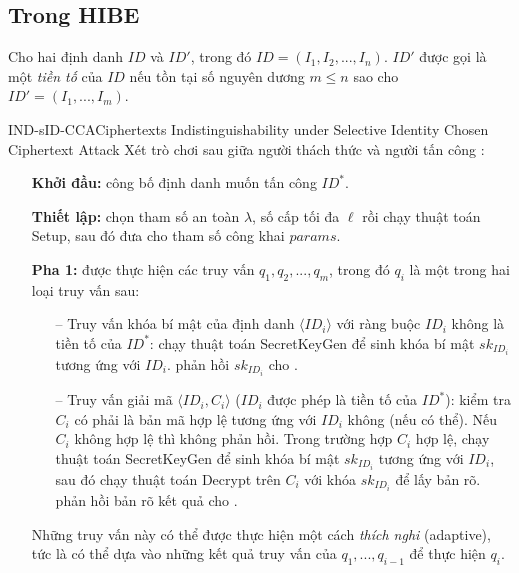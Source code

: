\documentclass[class=report, crop=false]{standalone}
\begin{document}
		\subsection{Trong HIBE}
			\begin{definition}
				Cho hai định danh $ID$ và $ID'$, trong đó $ID = (I_1, I_2, ..., I_n)$. $ID'$ được gọi là một \textit{tiền tố} của $ID$ nếu tồn tại số nguyên dương $m \leq n$ sao cho $ID' = (I_1, ..., I_m)$.
			\end{definition}
			\newpage
			\begin{game}{IND-sID-CCA}{Ciphertexts Indistinguishability under Selective Identity Chosen Ciphertext Attack}
				Xét trò chơi sau giữa người thách thức \challenger và người tấn công \adversary:
				\vspace{-1.8\baselineskip}
				\begin{itemize}[leftmargin=1.5cm, itemindent=-0.5cm]
					\item[] \textbf{Khởi đầu:} \adversary công bố định danh muốn tấn công $ID^*$.
					\item[] \textbf{Thiết lập:} \challenger chọn tham số an toàn $\lambda$, số cấp tối đa $\ell$ rồi chạy thuật toán \textsf{Setup}, sau đó đưa cho \adversary tham số công khai $params$.
					\item[] \textbf{Pha 1:} \adversary được thực hiện các truy vấn $q_1, q_2, ..., q_m$, trong đó $q_i$ là một trong hai loại truy vấn sau:
					\begin{itemize}
						\item[--] Truy vấn khóa bí mật của định danh $\langle ID_i \rangle$ với ràng buộc $ID_i$ không là tiền tố của $ID^*$: \challenger chạy thuật toán \textsf{SecretKeyGen} để sinh khóa bí mật $sk_{ID_i}$ tương ứng với $ID_i$. \challenger phản hồi $sk_{ID_i}$ cho \adversary .
						\item[--] Truy vấn giải mã $\langle ID_i, C_i \rangle$ ($ID_i$ được phép là tiền tố của $ID^*$): \challenger kiểm tra $C_i$ có phải là bản mã hợp lệ tương ứng với $ID_i$ không (nếu có thể). Nếu $C_i$ không hợp lệ thì \challenger không phản hồi. Trong trường hợp $C_i$ hợp lệ, \challenger chạy thuật toán \textsf{SecretKeyGen} để sinh khóa bí mật $sk_{ID_i}$ tương ứng với $ID_i$, sau đó chạy thuật toán \textsf{Decrypt} trên $C_i$ với khóa $sk_{ID_i}$ để lấy bản rõ. \challenger phản hồi bản rõ kết quả cho \adversary .
					\end{itemize}
					Những truy vấn này có thể được thực hiện một cách \emph{thích nghi} (adaptive), tức là \adversary có thể dựa vào những kết quả truy vấn của $q_1, ..., q_{i - 1}$ để thực hiện $q_i$.

\end{itemize}
\end{game}
\end{document}
